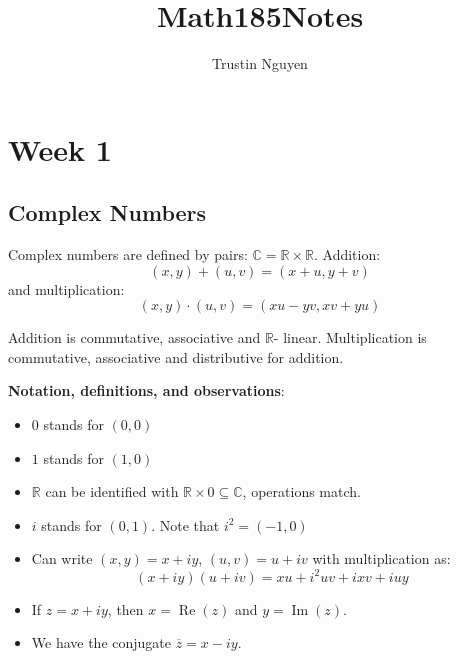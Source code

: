 \documentclass{report}
\title{Math185Notes}
\author{Trustin Nguyen}
\begin{document}
\begin{titlepage}
    \maketitle
\end{titlepage}

\tableofcontents
\restoregeometry

\reversemarginpar

\chapter{Week 1}

\begin{topic}
    \section{Complex Numbers}
\end{topic}

Complex numbers are defined by pairs: $\mathbb{C} = \mathbb{R} \times \mathbb{R}$. Addition:
    \begin{equation*}
        (x, y) + (u, v) = (x + u, y+ v)
    \end{equation*}
and multiplication:
    \begin{equation*}
        (x, y) \cdot (u, v) = (xu - yv, xv + yu)
    \end{equation*}

\begin{theorem}{}
    Addition is commutative, associative and $\mathbb{R} $- linear. Multiplication is commutative, associative and distributive for addition.
\end{theorem}

\textbf{Notation, definitions, and observations}:
    \begin{itemize}
        \item  $0$ stands for $(0, 0)$

        \item  $1$ stands for $(1, 0)$

        \item  $\mathbb{R}$ can be identified with $\mathbb{R} \times 0 \subseteq \mathbb{C}$, operations match.

        \item  $i$ stands for $(0, 1)$. Note that $i^{2} = (-1, 0)$

        \item Can write $(x, y) = x + iy$, $(u, v) = u + iv$ with multiplication as:
            \begin{equation*}
                (x + iy)(u + iv) = xu + i^{2} uv + ixv + iuy
            \end{equation*}

        \item If $z = x + iy$, then $x = \mathop{Re}(z)$ and $y = \mathop{Im}(z)$.

        \item We have the conjugate $\overline{z} = x - iy$. 
    \end{itemize}
\end{document}
